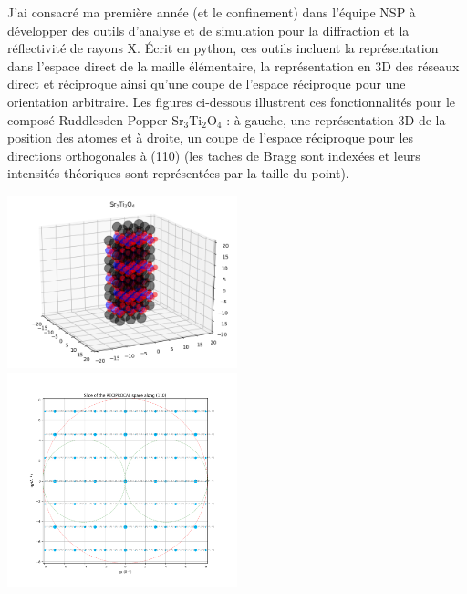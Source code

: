J'ai consacré ma première année (et le confinement) dans l'équipe NSP à développer des outils d'analyse et de simulation pour la diffraction et la réflectivité de rayons X.
\'Ecrit en python, ces outils incluent la représentation dans l'espace direct de la maille élémentaire, la représentation en 3D des réseaux direct et réciproque ainsi qu'une coupe de l'espace réciproque pour une orientation arbitraire.
Les figures ci-dessous illustrent ces fonctionnalités pour le composé Ruddlesden-Popper Sr$_3$Ti$_2$O$_4$ : à gauche, une représentation 3D de la position des atomes et à droite, un coupe de l'espace réciproque pour les directions orthogonales à (110) (les taches de Bragg sont indexées et leurs intensités théoriques sont représentées par la taille du point).
\par
\includegraphics[width=0.5\textwidth]{./figures/RP1_Cell_Drawer.png}
\includegraphics[width=0.5\textwidth]{./figures/RP1_RSSlice.png}

